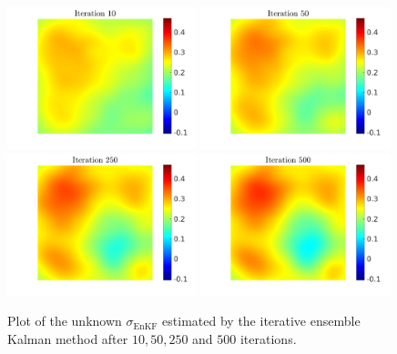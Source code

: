 \documentclass[10pt]{article}
\begin{document}
\begin{figure}[t]
\centering
\includegraphics[width = 0.49\textwidth]{figures/ensemble_10}
\includegraphics[width = 0.49\textwidth]{figures/ensemble_50}
\\
\includegraphics[width = 0.49\textwidth]{figures/ensemble_250}
\includegraphics[width = 0.49\textwidth]{figures/ensemble_500}
\caption{Plot of the unknown $\sigma_{\mathrm{EnKF}}$ estimated by the iterative ensemble Kalman method after $10, 50, 250$ and $500$ iterations.}
\label{fig:best_solution}
\end{figure}
\end{document}
